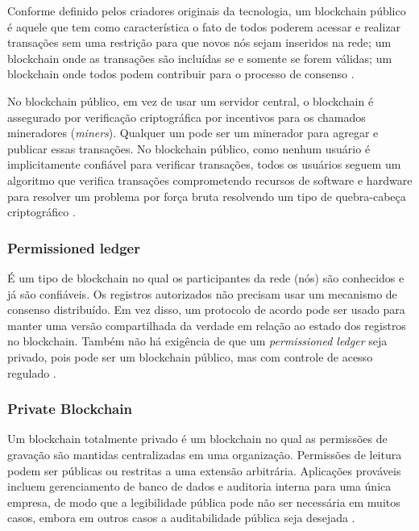     Conforme definido pelos criadores originais da tecnologia, um blockchain público é aquele que tem como característica o fato de todos poderem acessar e realizar transações sem uma restrição para que novos nós sejam inseridos na rede; um blockchain onde as transações são incluídas se e somente se forem válidas; um blockchain onde todos podem contribuir para o processo de consenso \cite{blockchain_pratical_guide}.
    
    No blockchain público, em vez de usar um servidor central, o blockchain é assegurado por verificação criptográfica por incentivos para os chamados mineradores (\textit{miners}). Qualquer um pode ser um minerador para agregar e publicar essas transações. No blockchain público, como nenhum usuário é implicitamente confiável para verificar transações, todos os usuários seguem um algoritmo que verifica transações comprometendo recursos de software e hardware para resolver um problema por força bruta resolvendo um tipo de quebra-cabeça criptográfico  \cite{blockchain_pratical_guide}.
    

    \subsubsection{Permissioned ledger}
    
    É um tipo de blockchain no qual os participantes da rede (nós) são conhecidos e já são confiáveis. Os registros autorizados não precisam usar um mecanismo de consenso distribuído. Em vez disso, um protocolo de acordo pode ser usado para manter uma versão compartilhada da verdade em relação ao estado dos registros no blockchain. Também não há exigência de que um \textit{permissioned ledger} seja privado, pois pode ser um blockchain público, mas com controle de acesso regulado \cite{mastering_blockchain}.

    \subsubsection{Private Blockchain}

    Um blockchain totalmente privado é um blockchain no qual as permissões de gravação são mantidas centralizadas em uma organização. Permissões de leitura podem ser públicas ou restritas a uma extensão arbitrária. Aplicações prováveis incluem gerenciamento de banco de dados e auditoria interna para uma única empresa, de modo que a legibilidade pública pode não ser necessária em muitos casos, embora em outros casos a auditabilidade pública seja desejada  \cite{blockchain_pratical_guide}.



